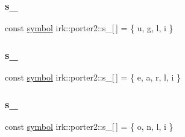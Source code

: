 \mbox{\label{namespaceirk_1_1porter2_abd1b5f0a5e839ff9080b7e0de18f2953}} 
\subsubsection{\texorpdfstring{s\+\_}{s\_35}}
{\footnotesize\ttfamily const \mbox{\hyperlink{namespaceirk_1_1porter2_afd04c4eb58a1dabcf8f3ab2d7e9f9ed5}{symbol}} irk\+::porter2\+::s\+\_\mbox{[}$\,$\mbox{]} = \{ \textquotesingle{}u\textquotesingle{}, \textquotesingle{}g\textquotesingle{}, \textquotesingle{}l\textquotesingle{}, \textquotesingle{}i\textquotesingle{} \}\hspace{0.3cm}{\ttfamily [static]}}

\mbox{\label{namespaceirk_1_1porter2_a1242e2a7b2c2bfcb27128af87d3213a0}} 
\subsubsection{\texorpdfstring{s\+\_}{s\_36}}
{\footnotesize\ttfamily const \mbox{\hyperlink{namespaceirk_1_1porter2_afd04c4eb58a1dabcf8f3ab2d7e9f9ed5}{symbol}} irk\+::porter2\+::s\+\_\mbox{[}$\,$\mbox{]} = \{ \textquotesingle{}e\textquotesingle{}, \textquotesingle{}a\textquotesingle{}, \textquotesingle{}r\textquotesingle{}, \textquotesingle{}l\textquotesingle{}, \textquotesingle{}i\textquotesingle{} \}\hspace{0.3cm}{\ttfamily [static]}}

\mbox{\label{namespaceirk_1_1porter2_a6b2e20f1382a60c2bb7b40e42a4418b1}} 
\subsubsection{\texorpdfstring{s\+\_}{s\_37}}
{\footnotesize\ttfamily const \mbox{\hyperlink{namespaceirk_1_1porter2_afd04c4eb58a1dabcf8f3ab2d7e9f9ed5}{symbol}} irk\+::porter2\+::s\+\_\mbox{[}$\,$\mbox{]} = \{ \textquotesingle{}o\textquotesingle{}, \textquotesingle{}n\textquotesingle{}, \textquotesingle{}l\textquotesingle{}, \textquotesingle{}i\textquotesingle{} \}\hspace{0.3cm}{\ttfamily [static]}}

